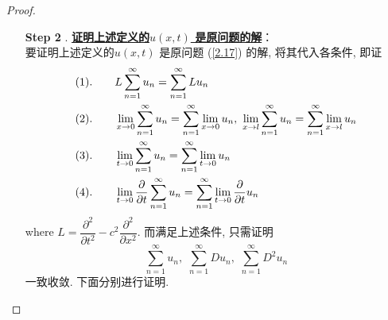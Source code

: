\begin{thm}
\begin{proof}
\begin{itemize}
\begin{enumerate}
					\vspace*{4em}
					
					\item[\textbf{Step 2}]. \underline{\textbf{证明上述定义的$u(x , t)$ 是原问题的解}}：\\
					要证明上述定义的$u(x , t)$ 是原问题 (\ref{2.17}) 的解, 将其代入各条件, 即证
					\begin{align*}
						&(1) . \hspace*{2em} L\sum_{n = 1}^{\infty} u_n = \sum_{n = 1}^{\infty} Lu_n \\
						&(2) . \hspace*{2em} \lim_{x \to 0} \sum_{n = 1}^{\infty} u_n = \sum_{n = 1}^{\infty} \lim_{x \to 0} u_n , \,\, \lim_{x \to l} \sum_{n = 1}^{\infty} u_n = \sum_{n = 1}^{\infty} \lim_{x \to l} u_n \\
						&(3) . \hspace*{2em} \lim_{t \to 0} \sum_{n = 1}^{\infty} u_n = \sum_{n = 1}^{\infty} \lim_{t \to 0} u_n \\
						&(4) . \hspace*{2em} \lim_{t \to 0} \frac{\partial}{\partial t} \sum_{n = 1}^{\infty} u_n = \sum_{n = 1}^{\infty} \lim_{t \to 0} \frac{\partial}{\partial t} u_n
					\end{align*}
					where $L = \dfrac{\partial^2}{\partial t^2} - c^2 \dfrac{\partial^2}{\partial x^2}$. 而满足上述条件, 只需证明
					\[ \sum_{n = 1}^{\infty} u_n , \,\, \sum_{n = 1}^{\infty} Du_n , \,\, \sum_{n = 1}^{\infty} D^2 u_n \]
					一致收敛. 下面分别进行证明. 
					
					\newpage
					

\end{enumerate}
\end{itemize}
\end{proof}
\end{thm}
